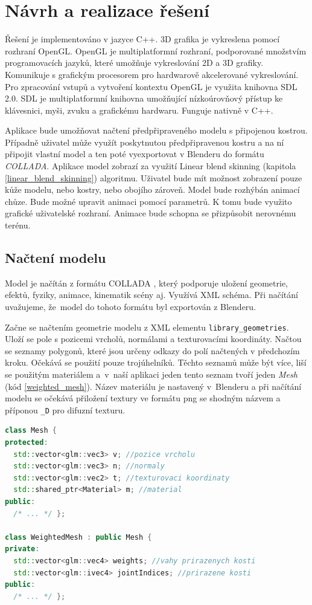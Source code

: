 \chapter{Návrh a realizace řešení}
Řešení je implementováno v jazyce C++. 3D grafika je vykreslena pomocí rozhraní OpenGL. OpenGL je multiplatformní rozhraní, podporované množstvím programovacích jazyků, které umožňuje vykreslování 2D a 3D grafiky. Komunikuje s grafickým procesorem pro hardwarově akcelerované vykreslování. Pro zpracování vstupů a vytvoření kontextu OpenGL je využita knihovna SDL 2.0. SDL je multiplatformní knihovna umožňující nízkoúrovňový přístup ke klávesnici, myši, zvuku a grafickému hardwaru. Funguje nativně v C++.

Aplikace bude umožňovat načtení předpřipraveného modelu s připojenou kostrou. Případně uživatel může využít poskytnutou předpřipravenou kostru a na ní připojit vlastní model a ten poté vyexportovat v Blenderu do formátu \textit{COLLADA}. Aplikace model zobrazí za využití Linear blend skinning (kapitola \ref{linear_blend_skinning}) algoritmu. Uživatel bude mít možnost zobrazení pouze kůže modelu, nebo kostry, nebo obojího zároveň. Model bude rozhýbán animací chůze. Bude možné upravit animaci pomocí parametrů. K tomu bude využito grafické uživatelské rozhraní. Animace bude schopna se přizpůsobit nerovnému terénu.

\section{Načtení modelu}
Model je načítán z formátu COLLADA \cite{collada}, který podporuje uložení geometrie, efektů, fyziky, animace, kinematik scény aj. Využívá XML schéma. Při načítání uvažujeme, že~model do tohoto formátu byl exportován z Blenderu.

Začne se načtením geometrie modelu z XML elementu  \texttt{library\_geometries}. Uloží se pole s pozicemi vrcholů, normálami a texturovacími koordináty. Načtou se seznamy polygonů, které jsou určeny odkazy do polí načtených v předchozím kroku. Očekává se použití pouze trojúhelníků. Těchto seznamů může být více, liší se použitým materiálem a~v~naší aplikaci jeden tento seznam tvoří jeden  \textit{Mesh} (kód \ref{weighted_mesh}). Název materiálu je nastavený v~Blenderu a při načítání modelu se očekává přiložení textury ve formátu png se shodným názvem a příponou \texttt{\_D} pro difuzní texturu.

\begin{lstlisting}[float,floatplacement=H,language=C++, caption={Třída modelu.}, label={weighted_mesh}]
class Mesh {
protected:
  std::vector<glm::vec3> v; //pozice vrcholu
  std::vector<glm::vec3> n; //normaly
  std::vector<glm::vec2> t; //texturovaci koordinaty
  std::shared_ptr<Material> m; //material
public:
  /* ... */ };
  
class WeightedMesh : public Mesh {
private:
  std::vector<glm::vec4> weights; //vahy prirazenych kosti
  std::vector<glm::ivec4> jointIndices; //prirazene kosti
public:
  /* ... */ };
\end{lstlisting}

